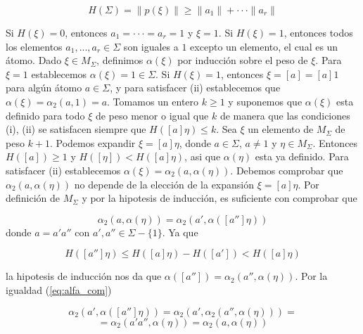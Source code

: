 \documentclass[12pt]{article}
\theoremstyle{definition}
\providecommand{\norm}[1]{\lVert#1\rVert}
\begin{document}
$$H(\Sigma)=\norm{p(\xi)}\geq\norm{a_1}+\cdot\cdot\cdot\norm{a_r}$$

Si $H(\xi)=0$, entonces $a_1=\cdot\cdot\cdot=a_r=1$ y $\xi=1$. Si $H(\xi)=1$, entonces todos los elementos $a_1,...,a_r\in\Sigma$ son iguales a $1$ excepto un elemento, el cual es un átomo.
\newline
\newline
Dado $\xi\in M_\Sigma$, definimos $\alpha(\xi)$ por inducción sobre el peso de $\xi$. Para $\xi=1$ establecemos $\alpha(\xi)=1\in\Sigma$. Si $H(\xi)=1$, entonces $\xi=[a]=[a]1$ para algún átomo $a\in\Sigma$, y para satisfacer (ii) establecemos que $\alpha(\xi)=\alpha_2(a,1)=a$.
\newline
\newline
Tomamos un entero $k\geq 1$ y suponemos que $\alpha(\xi)$ esta definido para todo $\xi$ de peso menor o igual que $k$ de manera que las condiciones (i), (ii) se satisfacen siempre que $H([a]\eta)\leq k$. Sea $\xi$ un elemento de $M_\Sigma$ de peso $k+1$. Podemos expandir $\xi=[a]\eta$, donde $a\in\Sigma$, $a\neq 1$ y $\eta\in M_\Sigma$. Entonces $H([a])\geq 1$ y $H([\eta]) < H([a]\eta)$, asi que $\alpha(\eta)$ esta ya definido. Para satisfacer (ii) establecemos $\alpha(\xi)=\alpha_2(a,\alpha(\eta))$. Debemos comprobar que $\alpha_2(a,\alpha(\eta))$ no depende de la elección de la expansión $\xi=[a]\eta$. Por definición de $M_\Sigma$ y por la hipotesis de inducción, es suficiente con comprobar que 

$$\alpha_2(a,\alpha(\eta))=\alpha_2(a',\alpha([a'']\eta))$$
\newline
\newline
donde $a=a'a''$ con $a',a''\in \Sigma -\{1\}$. Ya que

$$H([a'']\eta)\leq H([a]\eta) - H([a'])<H([a]\eta)$$
\newline

la hipotesis de inducción nos da que $\alpha([a''])=\alpha_2(a'',\alpha(\eta))$. Por la igualdad (\ref{eq:alfa_com}) 

$$\alpha_2(a',\alpha([a'']\eta))=\alpha_2(a',\alpha_2(a'',\alpha(\eta)))=$$
$$=\alpha_2(a'a'',\alpha(\eta))=\alpha_2(a,\alpha(\eta))$$
\end{document}
